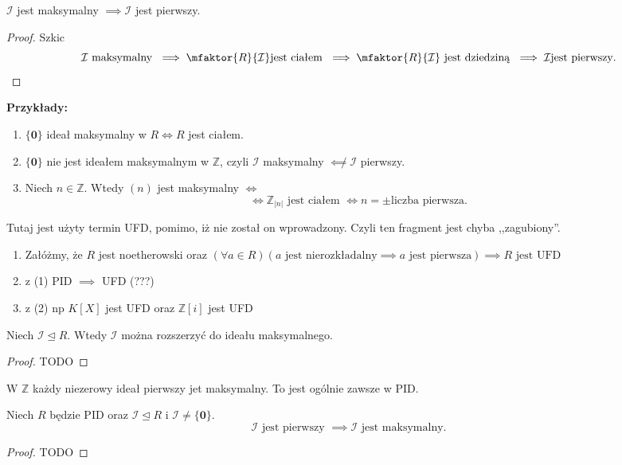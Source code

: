  \begin{corollary}
       $\mathcal{I}$ jest maksymalny $\implies \mathcal{I}$ jest pierwszy. 
 \end{corollary}
 \begin{proof}
 	Szkic
	\[
	\mathcal{I}\text{ maksymalny }\implies \mfaktor{R}{\mathcal{I}} \text{jest ciałem }\implies \mfaktor{R}{\mathcal{I}} \text{ jest dziedziną } \implies\mathcal{I} \text{jest pierwszy}
	.\] 
 \end{proof}
 \noindent \textbf{Przykłady:}
 \begin{enumerate}[label=\arabic*)]
	 \item $\{\mathbf{0}\} $ ideał maksymalny w $R \iff R $ jest ciałem.
	 \item $\{\mathbf{0}\} $ nie jest ideałem maksymalnym w $\mathbb{Z} $, czyli $\mathcal{I}$ maksymalny $\not\impliedby \mathcal{I}$ pierwszy.
	 \item Niech $ n\in \mathbb{Z} $. Wtedy $\left( n \right) $ jest maksymalny $\iff$
		 \[
		 \iff \mathbb{Z} _{\left| n \right| } \text{ jest ciałem } \iff n = \pm \text{liczba pierwsza}
		 .\] 
 \end{enumerate}
\begin{corollary}
     Tutaj jest użyty termin UFD, pomimo, iż nie został on wprowadzony. Czyli ten fragment jest chyba ,,zagubiony''.
     \begin{enumerate}[label=\arabic*)]
     	\item Załóżmy, że $R$ jest noetherowski oraz $\left(\forall a\in R \right)\left( a\text{ jest nierozkładalny}\implies a \text{ jest pierwsza} \right)  \implies R \text{ jest UFD}$ 
	\item z (1) PID $\implies$ UFD (???)
	\item z (2) np $K\left[ X \right] $ jest UFD oraz $\mathbb{Z} \left[ i \right] $ jest UFD
     \end{enumerate}
\end{corollary}
\begin{theorem}
	Niech $\mathcal{I}\unlhd R.$ Wtedy $\mathcal{I}$ można rozszerzyć do ideału maksymalnego.
\end{theorem} 
\begin{proof}
	TODO
\end{proof} 
\begin{remark}
	W $\mathbb{Z} $ każdy niezerowy ideał pierwszy jet maksymalny. To jest ogólnie zawsze w PID.
\end{remark} 
\begin{theorem}
	Niech $R$ będzie PID oraz $\mathcal{I}\unlhd R$ i $\mathcal{I}\neq \{\mathbf{0}\} $.
	\[
	\mathcal{I} \text{ jest pierwszy }\implies \mathcal{I} \text{ jest maksymalny}
	.\] 
\end{theorem} 
\begin{proof}
	TODO
\end{proof} 
